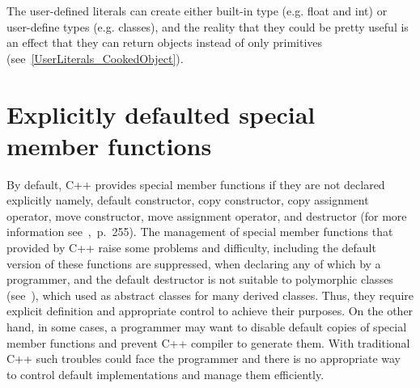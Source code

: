 \documentclass[11pt]{report}
\begin{document}
The user-defined literals can create either built-in type (e.g. float and int) or user-define types (e.g. classes), and the reality that they could be pretty useful is an effect that they can return objects instead of only primitives (see~\ref{UserLiterals_CookedObject}).


\section{Explicitly defaulted special member functions}
\label{section: Defaulted special member functions}
By default, C++ provides special member functions if they are not declared explicitly namely, default constructor, copy constructor, copy assignment operator, move constructor, move assignment operator, and destructor (for more information see~\cite{ISO:2011:Cpplanguage},~p.~255). The management of special member functions that provided by C++ raise some problems and difficulty, including the default version of these functions are suppressed, when declaring any of which by a programmer, and the default destructor is not suitable to polymorphic classes (see~\cite{Stroustrup:2012:Cpp11}), which used as abstract classes for many derived classes. Thus, they require explicit definition and appropriate control to achieve their purposes. On the other hand, in some cases, a programmer may want to disable default copies of special member functions and prevent C++ compiler to generate them. With traditional C++ such troubles could face the programmer and there is no appropriate way to control default implementations and manage them efficiently.
\end{document}
